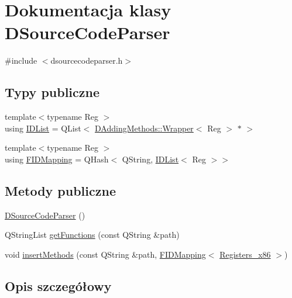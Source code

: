 \hypertarget{class_d_source_code_parser}{\section{Dokumentacja klasy D\-Source\-Code\-Parser}
\label{class_d_source_code_parser}
}


{\ttfamily \#include $<$dsourcecodeparser.\-h$>$}

\subsection*{Typy publiczne}
\begin{DoxyCompactItemize}
\item 
{\footnotesize template$<$typename Reg $>$ }\\using \hyperlink{class_d_source_code_parser_a549c58566517a32131066635fc033088}{I\-D\-List} = Q\-List$<$ \hyperlink{class_d_adding_methods_1_1_wrapper}{D\-Adding\-Methods\-::\-Wrapper}$<$ Reg $>$ $\ast$ $>$
\item 
{\footnotesize template$<$typename Reg $>$ }\\using \hyperlink{class_d_source_code_parser_a0c023f4442337d52a190e157505fee11}{F\-I\-D\-Mapping} = Q\-Hash$<$ Q\-String, \hyperlink{class_d_source_code_parser_a549c58566517a32131066635fc033088}{I\-D\-List}$<$ Reg $>$$>$
\end{DoxyCompactItemize}
\subsection*{Metody publiczne}
\begin{DoxyCompactItemize}
\item 
\hyperlink{class_d_source_code_parser_adc1af3adbbe65247fcf93aedf8d72a4b}{D\-Source\-Code\-Parser} ()
\item 
Q\-String\-List \hyperlink{class_d_source_code_parser_a2bc1f34f3cf29f7f8e4e867dace9721f}{get\-Functions} (const Q\-String \&path)
\item 
void \hyperlink{class_d_source_code_parser_acb80a33d6f64af51009f3a09fbfd430b}{insert\-Methods} (const Q\-String \&path, \hyperlink{class_d_source_code_parser_a0c023f4442337d52a190e157505fee11}{F\-I\-D\-Mapping}$<$ \hyperlink{codedefines_8h_a0f84efe4ca4d99203713a78bd6e8c82e}{Registers\-\_\-x86} $>$)
\end{DoxyCompactItemize}


\subsection{Opis szczegółowy}


